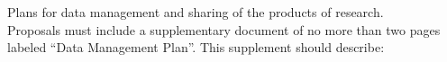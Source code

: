 











%
Plans for data management and sharing of the products of research.\\ 

Proposals must include a supplementary document of no more than
two pages labeled ``Data Management Plan''. This supplement should
describe:

